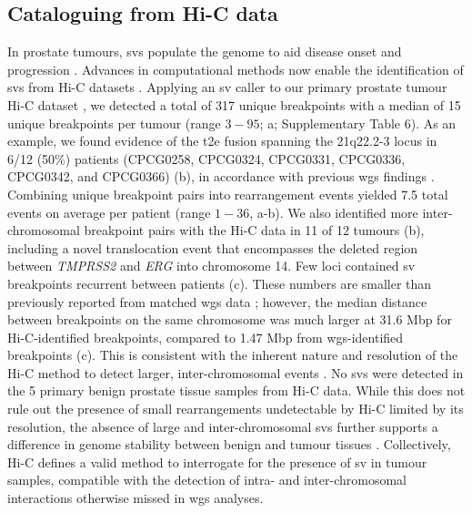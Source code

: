 \subsection{Cataloguing  from Hi-C data}

In prostate tumours, \glspl{sv} populate the genome to aid disease onset and progression \cite{fraserGenomicHallmarksLocalized2017,quigleyGenomicHallmarksStructural2018}.
Advances in computational methods now enable the identification of \glspl{sv} from Hi-C datasets \cite{dixonIntegrativeDetectionAnalysis2018,hoStructuralVariationSequencing2020}.
Applying an \gls{sv} caller to our primary prostate tumour Hi-C dataset \cite{dixonIntegrativeDetectionAnalysis2018}, we detected a total of 317 unique breakpoints with a median of 15 unique breakpoints per tumour (range $3-95$; a; Supplementary Table 6).
As an example, we found evidence of the \gls{t2e} fusion spanning the 21q22.2-3 locus in 6/12 (50\%) patients (CPCG0258, CPCG0324, CPCG0331, CPCG0336, CPCG0342, and CPCG0366) (b), in accordance with previous \gls{wgs} findings \cite{fraserGenomicHallmarksLocalized2017}.
Combining unique breakpoint pairs into rearrangement events yielded 7.5 total events on average per patient (range $1 - 36$, a-b).
We also identified more inter-chromosomal breakpoint pairs with the Hi-C data in 11 of 12 tumours (b), including a novel translocation event that encompasses the deleted region between \emph{TMPRSS2} and \emph{ERG} into chromosome 14.
Few loci contained \gls{sv} breakpoints recurrent between patients (c).
These numbers are smaller than previously reported from matched \gls{wgs} data \cite{fraserGenomicHallmarksLocalized2017}; however, the median distance between breakpoints on the same chromosome was much larger at 31.6 Mbp for Hi-C-identified breakpoints, compared to 1.47 Mbp from \gls{wgs}-identified breakpoints (c).
This is consistent with the inherent nature and resolution of the Hi-C method to detect larger, inter-chromosomal events \cite{dixonIntegrativeDetectionAnalysis2018}.
No \glspl{sv} were detected in the 5 primary benign prostate tissue samples from Hi-C data.
While this does not rule out the presence of small rearrangements undetectable by Hi-C limited by its resolution, the absence of large and inter-chromosomal \glspl{sv} further supports a difference in genome stability between benign and tumour tissues \cite{fraserGenomicHallmarksLocalized2017,bergerGenomicComplexityPrimary2011,bacaPunctuatedEvolutionProstate2013,mazrooeiCistromePartitioningReveals2019}.
Collectively, Hi-C defines a valid method to interrogate for the presence of \gls{sv} in tumour samples, compatible with the detection of intra- and inter-chromosomal interactions otherwise missed in \gls{wgs} analyses.

